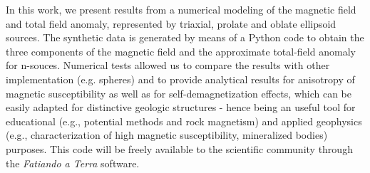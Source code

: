 \begin{foreignabstract}

In this work, we present results from a numerical
modeling of the magnetic field and total field anomaly,
represented by triaxial, prolate and oblate ellipsoid sources.
The synthetic data is generated by means of a Python code to obtain
the three components of the magnetic field and the approximate total-field
anomaly for n-souces.
Numerical tests allowed us to compare the results with other implementation 
(e.g. spheres) and to provide analytical results for anisotropy of magnetic
susceptibility as well as for self-demagnetization effects,
which can be easily adapted for distinctive geologic
structures - hence being an useful tool for educational
(e.g., potential methods and rock magnetism) and applied
geophysics (e.g., characterization of high magnetic
susceptibility, mineralized bodies) purposes.
This code will be freely available to the scientific
community through the \textit{Fatiando a Terra} software. 

\end{foreignabstract}